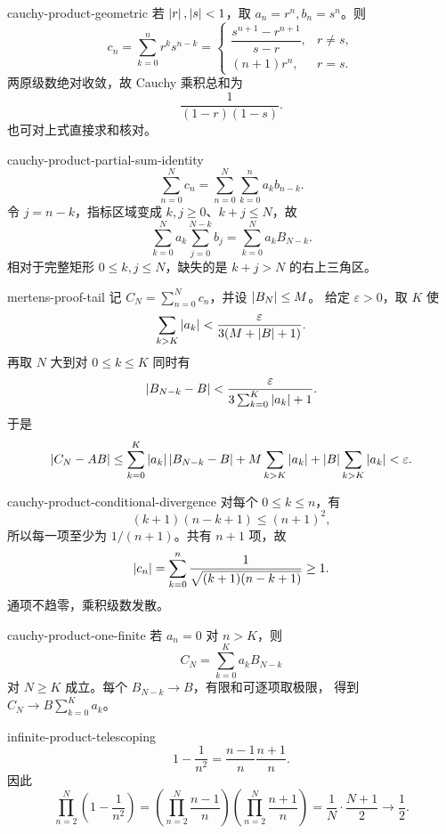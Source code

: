 \begin{solution}{cauchy-product-geometric}
若 \(\left|r\right|,\left|s\right|<1\)，取 \(a_n=r^n,b_n=s^n\)。则
\[
 c_n=\sum_{k=0}^nr^ks^{n-k}
 =\begin{cases}
 \dfrac{s^{n+1}-r^{n+1}}{s-r},&r\ne s,\\[0.6em]
 (n+1)r^n,&r=s.
 \end{cases}
\]
两原级数绝对收敛，故 Cauchy 乘积总和为
\[
 \frac1{(1-r)(1-s)}.
\]
也可对上式直接求和核对。
\end{solution}

\begin{solution}{cauchy-product-partial-sum-identity}
\[
 \sum_{n=0}^Nc_n
 =\sum_{n=0}^N\sum_{k=0}^na_kb_{n-k}.
\]
令 \(j=n-k\)，指标区域变成 \(k,j\ge0\)、\(k+j\le N\)，故
\[
 \sum_{k=0}^Na_k\sum_{j=0}^{N-k}b_j
 =\sum_{k=0}^Na_kB_{N-k}.
\]
相对于完整矩形 \(0\le k,j\le N\)，缺失的是 \(k+j>N\) 的右上三角区。
\end{solution}

\begin{solution}{mertens-proof-tail}
记 \(C_N=\sum_{n=0}^Nc_n\)，并设 \(\left|B_N\right|\le M\)。
给定 \(\varepsilon>0\)，取 \(K\) 使
\[
 \sum_{k>K}\left|a_k\right|
 <\frac{\varepsilon}{3(M+\left|B\right|+1)}.
\]
再取 \(N\) 大到对 \(0\le k\le K\) 同时有
\[
 \left|B_{N-k}-B\right|
 <\frac{\varepsilon}{3\sum_{k=0}^K\left|a_k\right|+1}.
\]
于是
\[
 \left|C_N-AB\right|
 \le\sum_{k=0}^K\left|a_k\right|\left|B_{N-k}-B\right|
 +M\sum_{k>K}\left|a_k\right|
 +\left|B\right|\sum_{k>K}\left|a_k\right|
 <\varepsilon.
\]
\end{solution}

\begin{solution}{cauchy-product-conditional-divergence}
对每个 \(0\le k\le n\)，有
\[
 (k+1)(n-k+1)\le(n+1)^2,
\]
所以每一项至少为 \(1/(n+1)\)。共有 \(n+1\) 项，故
\[
 \left|c_n\right|
 =\sum_{k=0}^n\frac1{\sqrt{(k+1)(n-k+1)}}\ge1.
\]
通项不趋零，乘积级数发散。
\end{solution}

\begin{solution}{cauchy-product-one-finite}
若 \(a_n=0\) 对 \(n>K\)，则
\[
 C_N=\sum_{k=0}^Ka_kB_{N-k}
\]
对 \(N\ge K\) 成立。每个 \(B_{N-k}\to B\)，有限和可逐项取极限，
得到 \(C_N\to B\sum_{k=0}^Ka_k\)。
\end{solution}

\begin{solution}{infinite-product-telescoping}
\[
 1-\frac1{n^2}=\frac{n-1}{n}\frac{n+1}{n}.
\]
因此
\[
 \prod_{n=2}^N\left(1-\frac1{n^2}\right)
 =\left(\prod_{n=2}^N\frac{n-1}{n}\right)
  \left(\prod_{n=2}^N\frac{n+1}{n}\right)
 =\frac1N\cdot\frac{N+1}{2}
 \longrightarrow\frac12.
\]
\end{solution}

